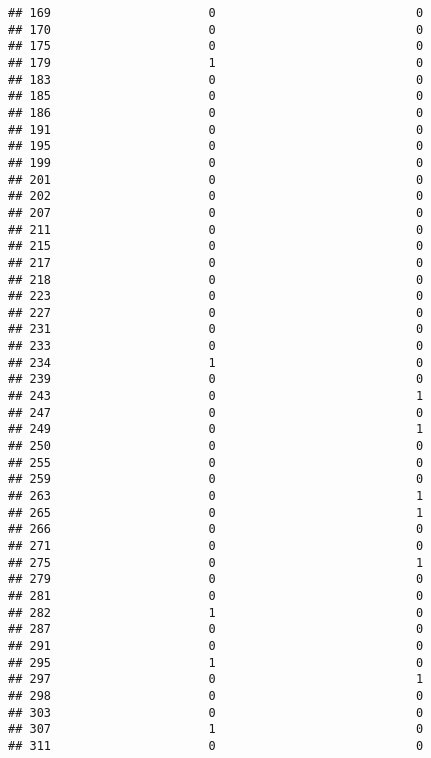 \documentclass[
]{article}
\begin{document}
\begin{verbatim}
## 169                      0                            0
## 170                      0                            0
## 175                      0                            0
## 179                      1                            0
## 183                      0                            0
## 185                      0                            0
## 186                      0                            0
## 191                      0                            0
## 195                      0                            0
## 199                      0                            0
## 201                      0                            0
## 202                      0                            0
## 207                      0                            0
## 211                      0                            0
## 215                      0                            0
## 217                      0                            0
## 218                      0                            0
## 223                      0                            0
## 227                      0                            0
## 231                      0                            0
## 233                      0                            0
## 234                      1                            0
## 239                      0                            0
## 243                      0                            1
## 247                      0                            0
## 249                      0                            1
## 250                      0                            0
## 255                      0                            0
## 259                      0                            0
## 263                      0                            1
## 265                      0                            1
## 266                      0                            0
## 271                      0                            0
## 275                      0                            1
## 279                      0                            0
## 281                      0                            0
## 282                      1                            0
## 287                      0                            0
## 291                      0                            0
## 295                      1                            0
## 297                      0                            1
## 298                      0                            0
## 303                      0                            0
## 307                      1                            0
## 311                      0                            0

\end{verbatim}
\end{document}
